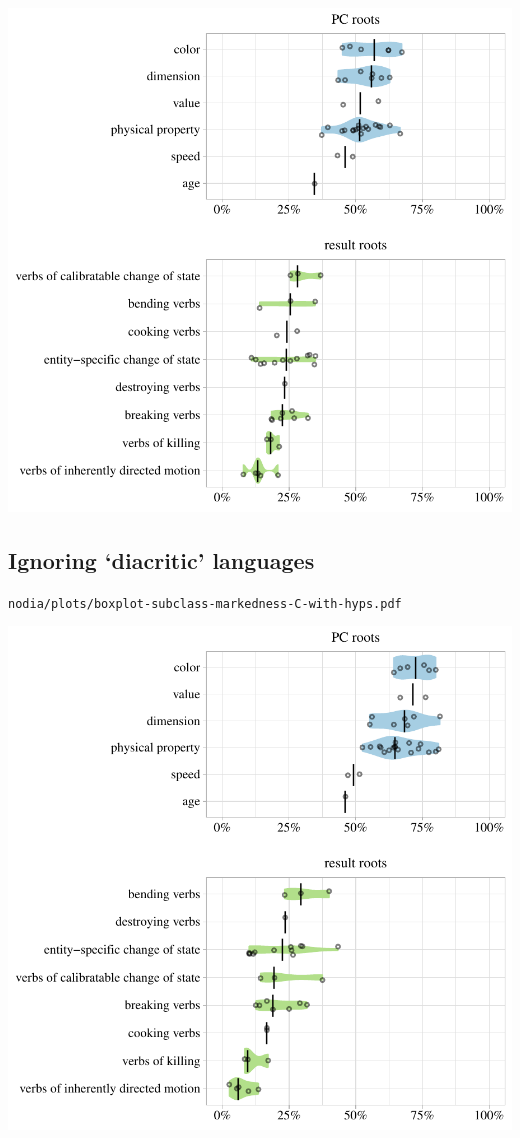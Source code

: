 \includegraphics[width=1.0\textwidth]{../nolow/plots/boxplot-subclass-markedness-C-with-hyps.pdf}

\subsection{Ignoring `diacritic' languages}

\texttt{nodia/plots/boxplot-subclass-markedness-C-with-hyps.pdf}

\includegraphics[width=1.0\textwidth]{../nodia/plots/boxplot-subclass-markedness-C-with-hyps.pdf}


